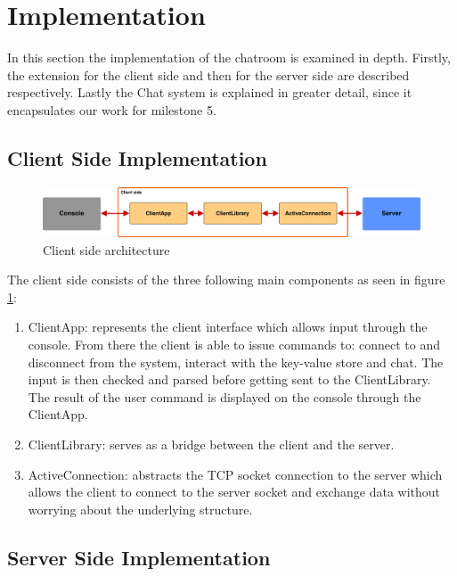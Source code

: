 \section{Implementation}
\label{sec:implementation}

In this section the implementation of the chatroom is examined in depth. Firstly, the extension for the client side and then for the server side are described respectively. Lastly the Chat system is explained in greater detail, since it encapsulates our work for milestone 5.

\subsection{Client Side Implementation}
\label{sec:Implementation_clintside}

\begin{figure}[h]
	\centering
	\includegraphics[width=\linewidth]{figures/client_arch.png}
	\caption{Client side architecture}
	\label{fig:client_arch}
\end{figure}

The client side consists of the three following main components as seen in figure \ref{fig:client_arch}:
\begin{enumerate} %
  \item ClientApp: represents the client interface which allows input through the console. From there the client is able to issue commands to: connect to and disconnect from the system, interact with the key-value store and chat. The input is then checked and parsed before getting sent to the ClientLibrary. The result of the user command is displayed on the console through the ClientApp.
  \item ClientLibrary: serves as a bridge between the client and the server.
  \item ActiveConnection: abstracts the TCP socket connection to the server which allows the client to connect to the server socket and exchange data without worrying about the underlying structure.
\end{enumerate}
 
\subsection{Server Side Implementation}
\label{sec:implementation_serverside}

